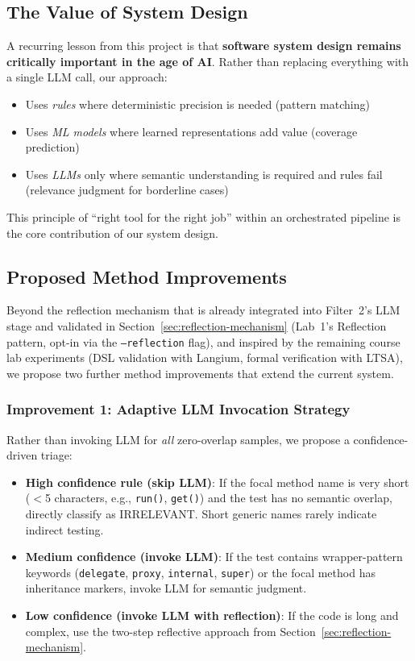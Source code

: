 \documentclass[acmlarge,nonacm,screen]{acmart}
\begin{document}
\subsection{The Value of System Design}

A recurring lesson from this project is that \textbf{software system design remains critically important in the age of AI}. Rather than replacing everything with a single LLM call, our approach:
\begin{itemize}
    \item Uses \textit{rules} where deterministic precision is needed (pattern matching)
    \item Uses \textit{ML models} where learned representations add value (coverage prediction)
    \item Uses \textit{LLMs} only where semantic understanding is required and rules fail (relevance judgment for borderline cases)
\end{itemize}

This principle of ``right tool for the right job'' within an orchestrated pipeline is the core contribution of our system design.

\subsection{Proposed Method Improvements}

Beyond the reflection mechanism that is already integrated into
Filter~2's LLM stage and validated in
Section~\ref{sec:reflection-mechanism} (Lab~1's Reflection
pattern, opt-in via the \texttt{--reflection} flag), and inspired
by the remaining course lab experiments (DSL validation with
Langium, formal verification with LTSA), we propose two further
method improvements that extend the current system.

\subsubsection{Improvement 1: Adaptive LLM Invocation Strategy}

Rather than invoking LLM for \textit{all} zero-overlap samples, we propose a confidence-driven triage:

\begin{itemize}
    \item \textbf{High confidence rule (skip LLM)}: If the focal method name is very short ($<$5 characters, e.g., \texttt{run()}, \texttt{get()}) and the test has no semantic overlap, directly classify as IRRELEVANT. Short generic names rarely indicate indirect testing.
    \item \textbf{Medium confidence (invoke LLM)}: If the test contains wrapper-pattern keywords (\texttt{delegate}, \texttt{proxy}, \texttt{internal}, \texttt{super}) or the focal method has inheritance markers, invoke LLM for semantic judgment.
    \item \textbf{Low confidence (invoke LLM with reflection)}: If the code is long and complex, use the two-step reflective approach from Section~\ref{sec:reflection-mechanism}.
\end{itemize}
\end{document}
